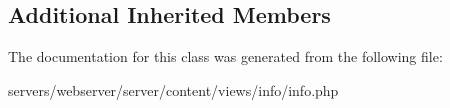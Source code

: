 \subsection*{Additional Inherited Members}


The documentation for this class was generated from the following file\+:\begin{DoxyCompactItemize}
\item 
servers/webserver/server/content/views/info/info.\+php\end{DoxyCompactItemize}
